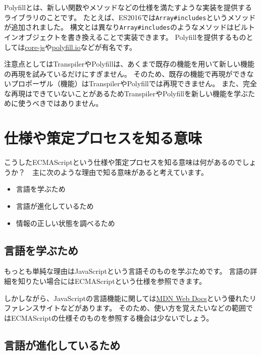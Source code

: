 Polyfillとは、新しい関数やメソッドなどの仕様を満たすような実装を提供するライブラリのことです。
たとえば、ES2016では\texttt{Array\#includes}というメソッドが追加されました。
構文とは異なり\texttt{Array\#includes}のようなメソッドはビルトインオブジェクトを書き換えることで実装できます。
Polyfillを提供するものとしては\href{https://github.com/zloirock/core-js}{core-js}や\href{https://polyfill.io/v2/docs/}{polyfill.io}などが有名です。

注意点としてはTranspilerやPolyfillは、あくまで既存の機能を用いて新しい機能の再現を試みているだけにすぎません。
そのため、既存の機能で再現ができないプロポーザル（機能）はTranspilerやPolyfillでは再現できません。
また、完全な再現はできていないことがあるためTranspilerやPolyfillを新しい機能を学ぶために使うべきではありません。

\hypertarget{meaning-specification-process}{%
\section{仕様や策定プロセスを知る意味}\label{meaning-specification-process}}

こうしたECMAScriptという仕様や策定プロセスを知る意味は何があるのでしょうか？　主に次のような理由で知る意味があると考えています。

\begin{itemize}
\item
  言語を学ぶため
\item
  言語が進化しているため
\item
  情報の正しい状態を調べるため
\end{itemize}

\hypertarget{to-learn}{%
\subsection{言語を学ぶため}\label{to-learn}}

もっとも単純な理由はJavaScriptという言語そのものを学ぶためです。
言語の詳細を知りたい場合にはECMAScriptという仕様を参照できます。

しかしながら、JavaScriptの言語機能に関しては\href{https://developer.mozilla.org/ja/}{MDN
Web Docs}という優れたリファレンスサイトなどがあります。
そのため、使い方を覚えたいなどの範囲ではECMAScriptの仕様そのものを参照する機会は少ないでしょう。

\hypertarget{to-progress}{%
\subsection{言語が進化しているため}\label{to-progress}}

